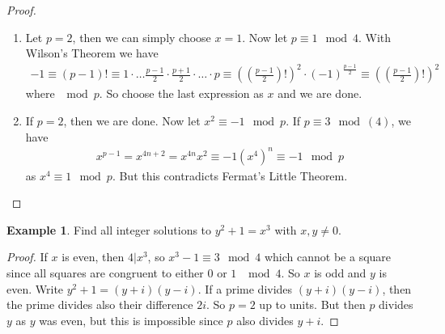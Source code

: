\documentclass[a4paper]{book}
\theoremstyle{definition}
\newtheorem{example}{Example}[definition]
\begin{document}
\begin{proof}
    \begin{enumerate}
        \item Let \(p = 2\), then we can simply choose \(x = 1\). Now let \(p \equiv 1 \mod{4}\). With Wilson's Theorem we have
        \begin{align*}
            -1 \equiv (p - 1)! \equiv 1 \cdot \ldots \frac{p - 1}{2} \cdot \frac{p + 1}{2} \cdot \ldots \cdot p \equiv \left(\left(\frac{p - 1}{2}\right)!\right)^2 \cdot (-1)^{\frac{p - 1}{2}} \equiv \left(\left(\frac{p - 1}{2}\right)!\right)^2
        \end{align*}
        where \(\mod{p}\). So choose the last expression as \(x\) and we are done.
        \item If \(p = 2\), then we are done. Now let \(x^2 \equiv -1 \mod{p}\). If \(p \equiv 3 \mod(4)\), we have
        \begin{align*}
            x^{p - 1} = x^{4n + 2} = x^{4n} x^2 \equiv -1 (x^4)^n \equiv -1 \mod{p}
        \end{align*}
        as \(x^4 \equiv 1 \mod{p}\). But this contradicts Fermat's Little Theorem.
    \end{enumerate}
\end{proof}
\begin{example}
    Find all integer solutions to \(y^2 + 1 = x^3\) with \(x, y \neq 0\).
\end{example}
\begin{proof}
    If \(x\) is even, then \(4 | x^3\), so \(x^3 - 1 \equiv 3 \mod 4\) which cannot be a square since all squares are congruent to either \(0\) or \(1\) \(\mod{4}\). So \(x\) is odd and \(y\) is even. Write \(y^2 + 1 = (y + i)(y - i)\). If a prime divides \((y + i)(y - i)\), then the prime divides also their difference \(2i\). So \(p = 2\) up to units. But then \(p\) divides \(y\) as \(y\) was even, but this is impossible since \(p\) also divides \(y + i\).
\end{proof}
\end{document}
